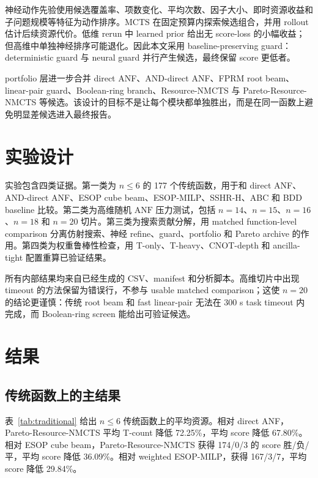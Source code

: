 \documentclass[UTF8,fontset=macnew,11pt]{ctexart}
\newcommand{\method}{Resource-NMCTS}
\newcommand{\pareto}{Pareto-Resource-NMCTS}
\newcommand{\anf}{\ensuremath{\mathrm{ANF}}}
\newcommand{\mcts}{\ensuremath{\mathrm{MCTS}}}
\begin{document}
神经动作先验使用候选覆盖率、项数变化、平均次数、因子大小、即时资源收益和子问题规模等特征为动作排序。\mcts{} 在固定预算内探索候选组合，并用 rollout 估计后续资源代价。低维 rerun 中 learned prior 给出无 score-loss 的小幅收益；但高维中单独神经排序可能退化。因此本文采用 baseline-preserving guard：deterministic guard 与 neural guard 并行产生候选，最终保留 score 更低者。

portfolio 层进一步合并 direct ANF、AND-direct ANF、FPRM root beam、linear-pair guard、Boolean-ring branch、\method{} 与 \pareto{} 等候选。该设计的目标不是让每个模块都单独胜出，而是在同一函数上避免明显差候选进入最终报告。

\section{实验设计}

实验包含四类证据。第一类为 $n\leq6$ 的 177 个传统函数，用于和 direct ANF、AND-direct ANF、ESOP cube beam、ESOP-MILP、SSHR-H、ABC 和 BDD baseline 比较。第二类为高维随机 \anf{} 压力测试，包括 $n=14$、$n=15$、$n=16$、$n=18$ 和 $n=20$ 切片。第三类为搜索贡献分解，用 matched function-level comparison 分离仿射搜索、神经 refine、guard、portfolio 和 Pareto archive 的作用。第四类为权重鲁棒性检查，用 T-only、T-heavy、CNOT-depth 和 ancilla-tight 配置重算已验证结果。

所有内部结果均来自已经生成的 CSV、manifest 和分析脚本。高维切片中出现 timeout 的方法保留为错误行，不参与 usable matched comparison；这使 $n=20$ 的结论更谨慎：传统 root beam 和 fast linear-pair 无法在 300 s task timeout 内完成，而 Boolean-ring screen 能给出可验证候选。

\section{结果}

\subsection{传统函数上的主结果}

表~\ref{tab:traditional} 给出 $n\leq6$ 传统函数上的平均资源。相对 direct ANF，\pareto{} 平均 T-count 降低 72.25\%，平均 score 降低 67.80\%。相对 ESOP cube beam，\pareto{} 获得 174/0/3 的 score 胜/负/平，平均 score 降低 36.09\%。相对 weighted ESOP-MILP，获得 167/3/7，平均 score 降低 29.84\%。
\end{document}
